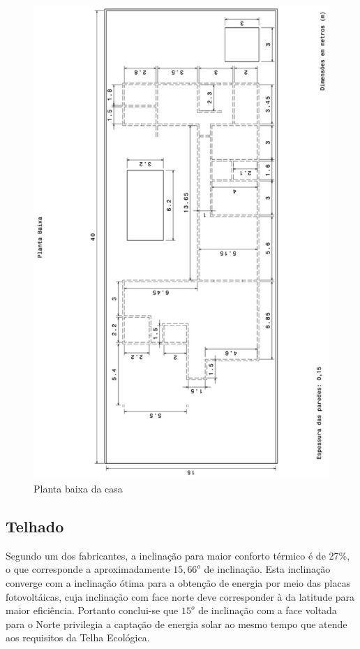 \begin{figure}[H]
  \begin{center}
	\includegraphics[keepaspectratio,scale=0.45,angle=270]{figuras/planta_baixa.eps}
	\caption{Planta baixa da casa}
  \end{center}
\end{figure}


\subsection{Telhado}

Segundo um dos fabricantes\cite{2013Onduline}, a inclinação para maior conforto térmico é de 27\%, o que corresponde a aproximadamente $15,66^o$ de inclinação. Esta inclinação converge com a inclinação ótima para a obtenção de energia por meio das placas fotovoltáicas, cuja inclinação com face norte deve corresponder à da latitude para maior eficiência\cite{2013Portal}. Portanto conclui-se que $15^o$ de inclinação com a face voltada para o Norte privilegia a captação de energia solar ao mesmo tempo que atende aos requisitos da Telha Ecológica.

